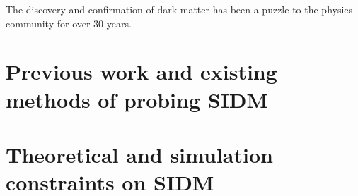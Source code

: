 \label{chapter:1}

The discovery and confirmation of dark matter has been a puzzle to the physics
community for over 30 years.

\section{Previous work and existing methods of probing SIDM}
\section{Theoretical and simulation constraints on SIDM}

